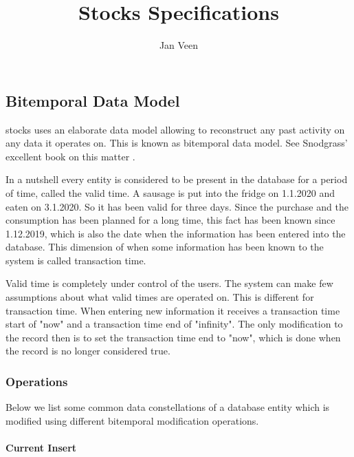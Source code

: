 \documentclass{memoir}
\title{Stocks Specifications}
\author{Jan Veen}
\begin{document}
\maketitle
\frontmatter

\tableofcontents
\listoffigures
\listoftables
\mainmatter

\part{}
\chapter{Bitemporal Data Model}

stocks uses an elaborate data model allowing to reconstruct any past activity on any data it operates on. This is known as bitemporal data model. See Snodgrass' excellent book on this matter \cite{snodgrass}.

In a nutshell every entity is considered to be present in the database for a period of time, called the valid time. A sausage is put into the fridge on 1.1.2020 and eaten on 3.1.2020. So it has been valid for three days. Since the purchase and the consumption has been planned for a long time, this fact has been known since 1.12.2019, which is also the date when the information has been entered into the database. This dimension of when some information has been known to the system is called transaction time.

Valid time is completely under control of the users. The system can make few assumptions about what valid times are operated on. This is different for transaction time. When entering new information it receives a transaction time start of "now" and a transaction time end of "infinity". The only modification to the record then is to set the transaction time end to "now", which is done when the record is no longer considered true.

\section{Operations}

Below we list some common data constellations of a database entity which is modified using different bitemporal modification operations.

\subsection{Current Insert}
\end{document}
